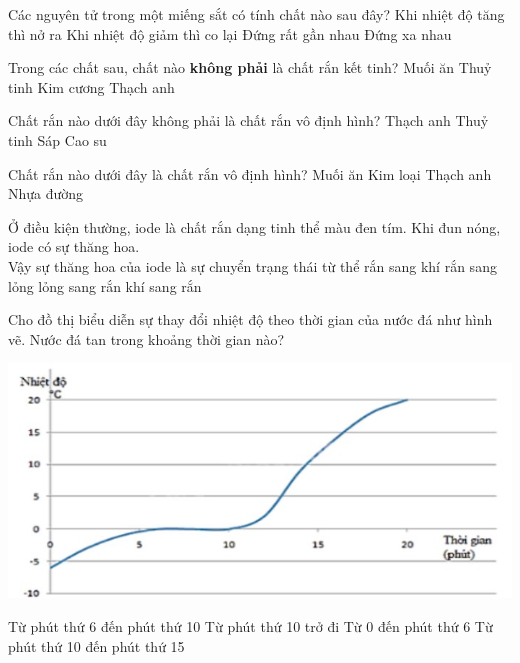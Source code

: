 \begin{ex}
Các nguyên tử trong một miếng sắt có tính chất nào sau đây?
\choice
{ Khi nhiệt độ tăng thì nở ra}
{ Khi nhiệt độ giảm thì co lại}
{\True Đứng rất gần nhau}
{ Đứng xa nhau}
\loigiai{ }
\end{ex}
\begin{ex}
Trong các chất sau, chất nào \textbf{không phải} là chất rắn kết tinh?
\choice
{ Muối ăn}
{\True Thuỷ tinh}
{ Kim cương}
{ Thạch anh}
\loigiai{ }
\end{ex}
\begin{ex}
Chất rắn nào dưới đây không phải là chất rắn vô định hình?
\choice
{\True Thạch anh}
{ Thuỷ tinh}
{ Sáp}
{ Cao su}
\loigiai{ }
\end{ex}
\begin{ex}
Chất rắn nào dưới đây là chất rắn vô định hình?
\choice
{ Muối ăn}
{ Kim loại}
{ Thạch anh}
{\True Nhựa đường}
\loigiai{ }
\end{ex}
\begin{ex}
Ở điều kiện thường, iode là chất rắn dạng tinh thể màu đen tím. Khi đun nóng, iode có sự thăng hoa.\\
Vậy sự thăng hoa của iode là sự chuyển trạng thái từ thể
\choice
{\True rắn sang khí}
{ rắn sang lỏng}
{ lỏng sang rắn}
{ khí sang rắn}
\loigiai{ }
\end{ex}
\begin{ex}
Cho đồ thị biểu diễn sự thay đổi nhiệt độ theo thời gian của nước đá như hình vẽ. Nước đá tan trong khoảng thời gian nào?
\begin{center}
\includegraphics[width=0.6\linewidth]{figs/VN12-Y24-PH-SYL-001P-1}
\end{center}
\choice
{\True Từ phút thứ 6 đến phút thứ 10}
{ Từ phút thứ 10 trở đi}
{ Từ 0 đến phút thứ 6}
{ Từ phút thứ 10 đến phút thứ 15}
\loigiai{ }
\end{ex}

